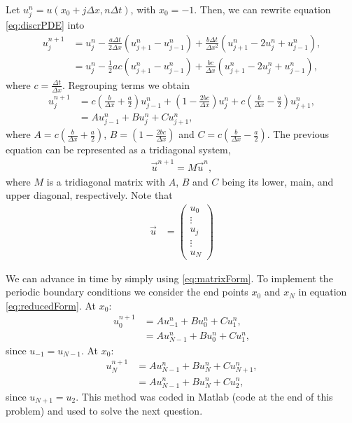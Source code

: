 \begin{questions}

\begin{solution}
Let $u_j^n = u(x_0+j\Delta x,n\Delta t)$, with $x_0 = -1$. Then, we can rewrite equation \eqref{eq:discrPDE} into
\begin{align*}
u_j^{n+1} &= u_j^n - \frac{a\Delta t}{2\Delta x}\left(u_{j+1}^n-u_{j-1}^n\right) + \frac{b\Delta t}{\Delta x^2}\left(u_{j+1}^n-2u_{j}^n+u_{j-1}^n\right),\\
&= u_j^n - \frac{1}{2}ac\left(u_{j+1}^n-u_{j-1}^n\right) + \frac{bc}{\Delta x}\left(u_{j+1}^n-2u_{j}^n+u_{j-1}^n\right),
\end{align*}
where $c = \frac{\Delta t}{\Delta x}$. Regrouping terms we obtain
\begin{align}\label{eq:reducedForm}
u_j^{n+1} &= c\left(\frac{b}{\Delta x}+\frac{a}{2}\right)u_{j-1}^n + \left(1-\frac{2bc}{\Delta x}\right)u_j^n + c\left(\frac{b}{\Delta x}-\frac{a}{2}\right)u_{j+1}^n,\nonumber\\
&= Au_{j-1}^n +Bu_j^n + Cu_{j+1}^n,
\end{align}
where $A = c\left(\frac{b}{\Delta x}+\frac{a}{2}\right)$, $B = \left(1-\frac{2bc}{\Delta x}\right)$ and $C = c\left(\frac{b}{\Delta x}-\frac{a}{2}\right)$. The previous equation can be represented as a tridiagonal system,
\begin{align}\label{eq:matrixForm}
\vec{u}^{n+1} = M\vec{u}^n,
\end{align}
where $M$ is a tridiagonal matrix with $A$, $B$ and $C$ being its lower, main, and upper diagonal, respectively. Note that 
\begin{align*}
\vec{u} &= \left(\begin{matrix}
           u_{0} \\
           \vdots \\
           u_{j} \\
           \vdots \\
           u_{N}
         \end{matrix}\right)
\end{align*}

We can advance in time by simply using \eqref{eq:matrixForm}. To implement the periodic boundary conditions we consider the end points $x_0$ and $x_N$ in equation \eqref{eq:reducedForm}.
At $x_0$:
\begin{align*}
u_0^{n+1} &= Au_{-1}^n +Bu_0^n + Cu_{1}^n,\\
&= Au_{N-1}^n +Bu_0^n + Cu_{1}^n,
\end{align*}
since $u_{-1} = u_{N-1}$.
At $x_0$:
\begin{align*}
u_N^{n+1} &= Au_{N-1}^n +Bu_N^n + Cu_{N+1}^n,\\
&= Au_{N-1}^n +Bu_N^n + Cu_{2}^n,
\end{align*}
since $u_{N+1} = u_{2}$. This method was coded in Matlab (code at the end of this problem) and used to solve the next question.
\end{solution}


\end{questions}
